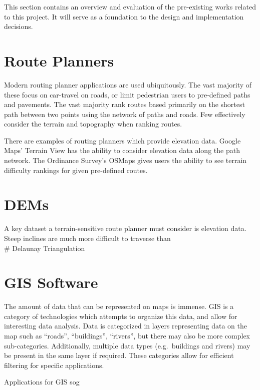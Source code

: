\documentclass[
]{article}
\author{200007413}
\date{2024-10-05}
\begin{document}
This section contains an overview and evaluation of the pre-existing
works related to this project. It will serve as a foundation to the
design and implementation decisions.

\hypertarget{route-planners}{%
\section{Route Planners}\label{route-planners}}

Modern routing planner applications are used ubiquitously. The vast
majority of these focus on car-travel on roads, or limit pedestrian
users to pre-defined paths and pavements. The vast majority rank routes
based primarily on the shortest path between two points using the
network of paths and roads. Few effectively consider the terrain and
topography when ranking routes.

There are examples of routing planners which provide elevation data.
Google Maps' Terrain View has the ability to consider elevation data
along the path network. The Ordinance Survey's OSMaps gives users the
ability to see terrain difficulty rankings for given pre-defined routes.

\hypertarget{dems}{%
\section{DEMs}\label{dems}}

A key dataset a terrain-sensitive route planner must consider is
elevation data. Steep inclines are much more difficult to traverse
than\\
\# Delaunay Triangulation

\hypertarget{gis-software}{%
\section{GIS Software}\label{gis-software}}

The amount of data that can be represented on maps is immense. GIS is a
category of technologies which attempts to organize this data, and allow
for interesting data analysis. Data is categorized in layers
representing data on the map such as ``roads'', ``buildings'',
``rivers'', but there may also be more complex sub-categories.
Additionally, multiple data types (e.g.~buildings and rivers) may be
present in the same layer if required. These categories allow for
efficient filtering for specific applications.

Applications for GIS sog
\end{document}
